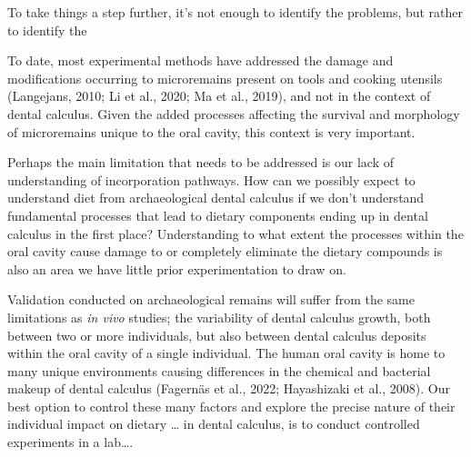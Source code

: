 \documentclass[
  letterpaper,
]{book}
\begin{document}
To take things a step further, it's not enough to identify the problems,
but rather to identify the

To date, most experimental methods have addressed the damage and
modifications occurring to microremains present on tools and cooking
utensils (Langejans, 2010; Li et al., 2020; Ma et al., 2019), and not in
the context of dental calculus. Given the added processes affecting the
survival and morphology of microremains unique to the oral cavity, this
context is very important.

Perhaps the main limitation that needs to be addressed is our lack of
understanding of incorporation pathways. How can we possibly expect to
understand diet from archaeological dental calculus if we don't
understand fundamental processes that lead to dietary components ending
up in dental calculus in the first place? Understanding to what extent
the processes within the oral cavity cause damage to or completely
eliminate the dietary compounds is also an area we have little prior
experimentation to draw on.

Validation conducted on archaeological remains will suffer from the same
limitations as \emph{in vivo} studies; the variability of dental
calculus growth, both between two or more individuals, but also between
dental calculus deposits within the oral cavity of a single individual.
The human oral cavity is home to many unique environments causing
differences in the chemical and bacterial makeup of dental calculus
(Fagernäs et al., 2022; Hayashizaki et al., 2008). Our best option to
control these many factors and explore the precise nature of their
individual impact on dietary \ldots{} in dental calculus, is to conduct
controlled experiments in a lab\ldots.
\end{document}
